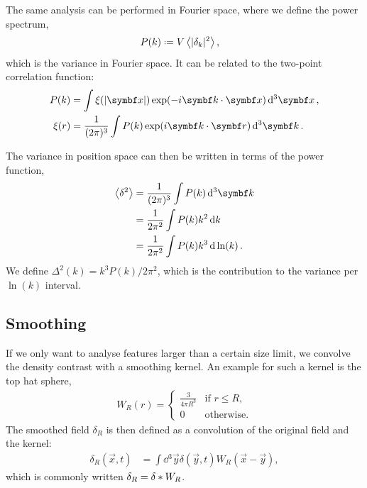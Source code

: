 The same analysis can be performed in Fourier space,
where we define the power spectrum,
\begin{align*}
	P(k)
	&\defeq V \moment{\abs{\delta_k}^2},
\end{align*}
which is the variance in Fourier space. It can be related to the two-point correlation function:
\begin{align*}
	P(k)
	&= \int \xi(\abs{\vec{x}}) \exp(-i\vec{k}\cdot\vec{x}) \dd{^3 \vec{x}},\\
	\xi(r)
	&= \frac{1}{(2\pi)^3} \int P(k) \exp(i \vec{k}\cdot\vec{r}) \dd{^3\vec{k}}.
\end{align*}
	
The variance in position space can then be written in terms of the power function,
\begin{align*}
	\moment{\delta^2}
	&= \frac{1}{(2\pi)^3} \int P(k) \dd{^3\vec{k}}\\
	&= \frac{1}{2\pi^2} \int P(k) k^2 \dd{k}\\
	&= \frac{1}{2\pi^2} \int P(k) k^3 \dd{\ln(k)}.
\end{align*}
We define $\Delta^2(k) = k^3 P(k)/2\pi^2$, which is the contribution to the variance per $\ln(k)$ interval.

\subsection{Smoothing}
If we only want to analyse features larger than a certain size limit, we convolve the density contrast with a smoothing kernel. An example for such a kernel is the top hat sphere,
\begin{align*}
	W_R(r) = 
	\begin{cases}
	\frac{3}{4\pi R^3} & \text{if } r \leq R,\\
	0 & \text{otherwise}.
	\end{cases}
\end{align*}
The smoothed field $\delta_R$ is then defined as a convolution of the original field and the kernel:
\begin{align*}
	\delta_R(\vec{x},t)
	&= \int \dd{^3 \vec{y}} \delta(\vec{y},t) W_R(\vec{x}-\vec{y}),
\end{align*}
which is commonly written $\delta_R = \delta * W_R$.

